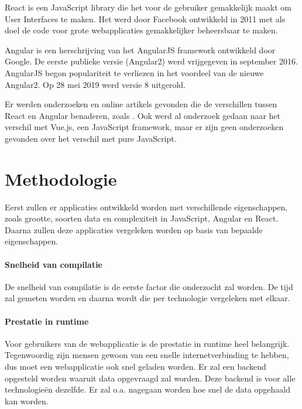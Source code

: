 React is een JavaScript library die het voor de gebruiker gemakkelijk maakt om User Interfaces te maken. Het werd door Facebook ontwikkeld in 2011 met als doel de code voor grote webapplicaties gemakkelijker beheersbaar te maken. \autocite{Chand2019}

Angular is een herschrijving van het AngularJS framework ontwikkeld door Google. De eerste publieke versie (Angular2) werd vrijgegeven in september 2016. AngularJS begon populariteit te verliezen in het voordeel van de nieuwe Angular2. Op 28 mei 2019 werd versie 8 uitgerold. \autocite{Bodrov-Krukowski2018}

Er werden onderzoeken en online artikels gevonden die de verschillen tussen React en Angular benaderen, zoals \textcite{Ari2018}. Ook werd al onderzoek gedaan naar het verschil met Vue.js, een JavaScript framework, maar er zijn geen onderzoeken gevonden over het verschil met pure JavaScript. 





\section{Methodologie}
\label{sec:methodologie}

Eerst zullen er applicaties ontwikkeld worden met verschillende eigenschappen, zoals grootte, soorten data en complexiteit in JavaScript, Angular en React. Daarna zullen deze applicaties vergeleken worden op basis van bepaalde eigenschappen. 
\paragraph{Snelheid van compilatie}
De snelheid van compilatie is de eerste factor die onderzocht zal worden. De tijd zal gemeten worden en daarna wordt die per technologie vergeleken met elkaar.
\paragraph{Prestatie in runtime}
Voor gebruikers van de webapplicatie is de prestatie in runtime heel belangrijk. Tegenwoordig zijn mensen gewoon van een snelle internetverbinding te hebben, dus moet een webapplicatie ook snel geladen worden. Er zal een backend opgesteld worden waaruit data opgevraagd zal worden. Deze backend is voor alle technologieën dezelfde. Er zal o.a. nagegaan worden hoe snel de data opgehaald kan worden.
